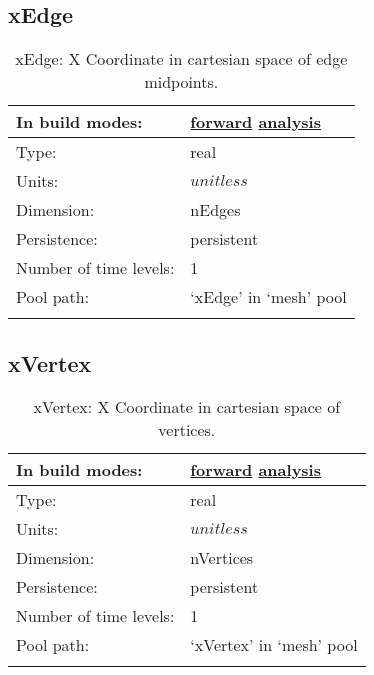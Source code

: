 \subsection[xEdge]{xEdge}
\label{subsec:var_sec_mesh_xEdge}
\begin{center}
\begin{longtable}{| p{2.0in} | p{4.0in} |}
        \hline 
        In build modes: & \hyperref[subsec:forward_var_tab_mesh]{forward} \hyperref[subsec:analysis_var_tab_mesh]{analysis} \\
        \hline 
        Type: & real \\
        \hline 
        Units: & $unitless$ \\
        \hline 
        Dimension: & nEdges \\
        \hline 
        Persistence: & persistent \\
        \hline 
        Number of time levels: & 1 \\
        \hline 
            Pool path: & `xEdge' in `mesh' pool \\
		 \hline 
    \caption{xEdge: X Coordinate in cartesian space of edge midpoints.}
\end{longtable}
\end{center}
\subsection[xVertex]{xVertex}
\label{subsec:var_sec_mesh_xVertex}
\begin{center}
\begin{longtable}{| p{2.0in} | p{4.0in} |}
        \hline 
        In build modes: & \hyperref[subsec:forward_var_tab_mesh]{forward} \hyperref[subsec:analysis_var_tab_mesh]{analysis} \\
        \hline 
        Type: & real \\
        \hline 
        Units: & $unitless$ \\
        \hline 
        Dimension: & nVertices \\
        \hline 
        Persistence: & persistent \\
        \hline 
        Number of time levels: & 1 \\
        \hline 
            Pool path: & `xVertex' in `mesh' pool \\
		 \hline 
    \caption{xVertex: X Coordinate in cartesian space of vertices.}
\end{longtable}
\end{center}
